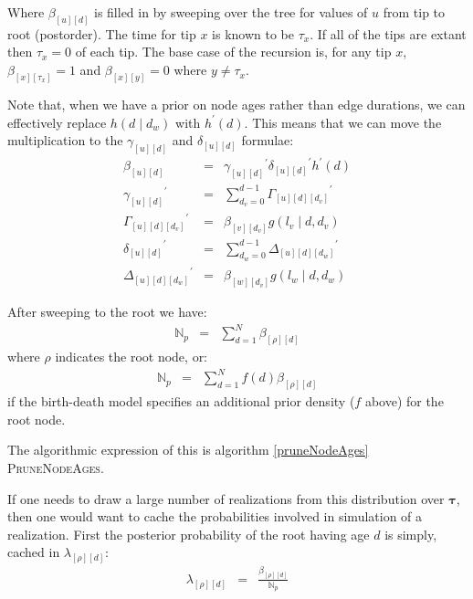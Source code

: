 \documentclass{llncs}
\newcommand{\edgeLen}[1]{\ensuremath{l_{#1}}\xspace}
\newcommand{\timeBinRealizationVec}[0]{\ensuremath{\bm{\tau}}\xspace}
\newcommand{\timeBinRealization}[1]{\ensuremath{\tau_{#1}}\xspace}
\newcommand{\subtreeAgeSum}[2]{\ensuremath{\beta_{[{#1}][{#2}]}}\xspace}
\newcommand{\leftThreeDTable}[3]{\ensuremath{\Gamma_{[{#1}][{#2}][{#3}]}}\xspace}
\newcommand{\rightThreeDTable}[3]{\ensuremath{\Delta_{[{#1}][{#2}][{#3}]}}\xspace}
\newcommand{\leftSubtreeAgeSum}[2]{\ensuremath{\gamma_{[{#1}][{#2}]}}\xspace}
\newcommand{\rightSubtreeAgeSum}[2]{\ensuremath{\delta_{[{#1}][{#2}]}}\xspace}
\newcommand{\ratePriorDensity}[0]{\ensuremath{g}\xspace}
\newcommand{\timePriorDensity}[0]{\ensuremath{h}\xspace}
\newcommand{\agePriorDensity}[0]{\ensuremath{h^{\prime}}\xspace}
\newcommand{\norm}[0]{\ensuremath{\mathbb{N}}\xspace}
\newcommand{\rootNode}[0]{\rho}
\newcommand{\rootPostProbCache}[2]{\ensuremath{\lambda_{[{#1}][{#2}]}}\xspace}
\begin{document}
Where $\subtreeAgeSum{u}{d}$ is filled in by sweeping over the tree for values of $u$ from tip to root (postorder).
The time for tip $x$ is known to be $\timeBinRealization{x}$. 
If all of the tips are extant then $\timeBinRealization{x}=0$ of each tip.
The base case of the recursion is, for any tip $x$, $\subtreeAgeSum{x}{\timeBinRealization{x}} = 1$ and $\subtreeAgeSum{x}{y} = 0$
where $y\neq\timeBinRealization{x}$.

Note that, when we have a prior on node ages rather than edge durations, we can effectively replace $\timePriorDensity(d\mid d_w)$ with $\agePriorDensity(d)$.
This means that we can move the multiplication to the $\leftSubtreeAgeSum{u}{d}$ and $\rightSubtreeAgeSum{u}{d}$ formulae:
\begin{eqnarray}
\subtreeAgeSum{u}{d} & = & \leftSubtreeAgeSum{u}{d}^{\prime} \rightSubtreeAgeSum{u}{d}^{\prime} \agePriorDensity(d) \label{nodeAgeSum} \\
\leftSubtreeAgeSum{u}{d}^{\prime} & = &  \sum_{d_v = 0}^{d-1} \leftThreeDTable{u}{d}{d_v}^{\prime} \label{leftSumForNodeAge} \\
\leftThreeDTable{u}{d}{d_v}^{\prime} & = & \subtreeAgeSum{v}{d_v} \ratePriorDensity(\edgeLen{v} \mid d, d_v) \label{leftSumForNodeAgeTerm} \\
\rightSubtreeAgeSum{u}{d}^{\prime} & = & \sum_{d_w = 0}^{d-1} \rightThreeDTable{u}{d}{d_w}^{\prime} \label{rightSumForNodeAge}\\
\rightThreeDTable{u}{d}{d_w}^{\prime} & = & \subtreeAgeSum{w}{d_v} \ratePriorDensity(\edgeLen{w} \mid d, d_w) \label{rightSumForNodeAgeTerm}
\end{eqnarray}


After sweeping to the root we have:
\begin{eqnarray}
    \norm_p & = & \sum_{d = 1}^{N} \subtreeAgeSum{\rootNode}{d}
\end{eqnarray}
where $\rootNode$ indicates the root node, or:
\begin{eqnarray}
    \norm_p & = & \sum_{d = 1}^{N} f(d)\subtreeAgeSum{\rootNode}{d}
\end{eqnarray}
if the birth-death model specifies an additional prior density ($f$ above) for the root node.


The algorithmic expression of this is algorithm \ref{pruneNodeAges} \textsc{PruneNodeAges}.

If one needs to draw a large number of realizations from this distribution over $\timeBinRealizationVec$,
    then one would want to cache the probabilities involved in simulation of 
    a realization.
First the posterior probability of the root having age $d$ is simply, cached in $\rootPostProbCache{\rootNode}{d}$:
\begin{eqnarray}
    \rootPostProbCache{\rootNode}{d} & = & \frac{\subtreeAgeSum{\rootNode}{d}}{\norm_p} \label{rootProb}
\end{eqnarray}
\end{document}
